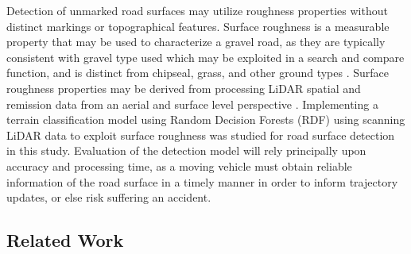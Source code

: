 \documentclass[balance,upint,subscriptcorrection,varvw,mathalfa=cal=boondoxo,colorlinks]{asmeconf}
\begin{document}
	{Detection of unmarked road surfaces may utilize roughness properties without distinct markings or topographical features. Surface roughness is a measurable property that may be used to characterize a gravel road, as they are typically consistent with gravel type used \cite{skorseth_gravel_nodate} which may be exploited in a search and compare function, and is distinct from chipseal, grass, and other ground types \cite{wan_road_2007, levi_3d_2012_light, levi_3d_2012_terrain}. Surface roughness properties may be derived from processing LiDAR spatial and remission data from an aerial and surface level perspective \cite{wan_road_2007, levi_3d_2012_light, levi_3d_2012_terrain, pollyea_experimental_2012,rychkov_computational_2012,lague_accurate_2013,brubaker_use_2013,turner_estimation_2014,campbell_lidar-based_2017,shepard_roughness_2001,tegowski_statistical_2016,sock_probabilistic_2016,milenkovic_roughness_2018,yadav_extraction_2017, yadav_rural_2018}. Implementing a terrain classification model using Random Decision Forests (RDF) using scanning LiDAR data to exploit surface roughness was studied for road surface detection in this study. Evaluation of the detection model will rely principally upon accuracy and processing time, as a moving vehicle must obtain reliable information of the road surface in a timely manner in order to inform trajectory updates, or else risk suffering an accident.}
	
\subsection{Related Work}
	
\end{document}
